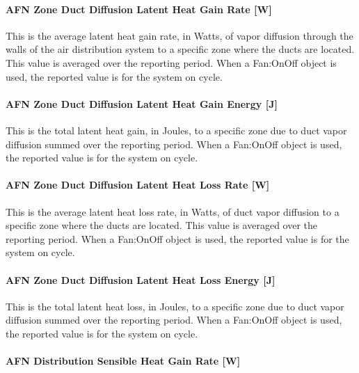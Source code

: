 \paragraph{AFN Zone Duct Diffusion Latent Heat Gain Rate {[}W{]}}\label{afn-zone-duct-diffusion-latent-heat-gain-rate-w}

This is the average latent heat gain rate, in Watts, of vapor diffusion through the walls of the air distribution system to a specific zone where the ducts are located. This value is averaged over the reporting period. When a Fan:OnOff object is used, the reported value is for the system on cycle.

\paragraph{AFN Zone Duct Diffusion Latent Heat Gain Energy {[}J{]}}\label{afn-zone-duct-diffusion-latent-heat-gain-energy-j}

This is the total latent heat gain, in Joules, to a specific zone due to duct vapor diffusion summed over the reporting period. When a Fan:OnOff object is used, the reported value is for the system on cycle.

\paragraph{AFN Zone Duct Diffusion Latent Heat Loss Rate {[}W{]}}\label{afn-zone-duct-diffusion-latent-heat-loss-rate-w}

This is the average latent heat loss rate, in Watts, of duct vapor diffusion to a specific zone where the ducts are located. This value is averaged over the reporting period. When a Fan:OnOff object is used, the reported value is for the system on cycle.

\paragraph{AFN Zone Duct Diffusion Latent Heat Loss Energy {[}J{]}}\label{afn-zone-duct-diffusion-latent-heat-loss-energy-j}

This is the total latent heat loss, in Joules, to a specific zone due to duct vapor diffusion summed over the reporting period. When a Fan:OnOff object is used, the reported value is for the system on cycle.

\paragraph{AFN Distribution Sensible Heat Gain Rate {[}W{]}}\label{afn-distribution-sensible-heat-gain-rate-w}


